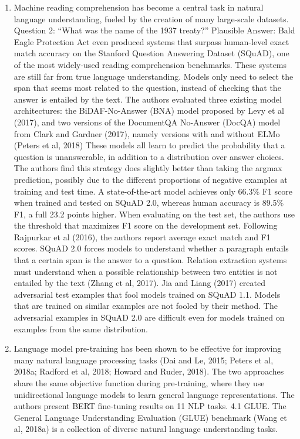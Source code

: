 \documentclass[11pt]{article}
\begin{document}
\begin{enumerate}
    \item Machine reading comprehension has become a central task in natural language understanding, fueled by the creation of many large-scale datasets. Question 2: “What was the name of the 1937 treaty?” Plausible Answer: Bald Eagle Protection Act even produced systems that surpass human-level exact match accuracy on the Stanford Question Answering Dataset (SQuAD), one of the most widely-used reading comprehension benchmarks. These systems are still far from true language understanding. Models only need to select the span that seems most related to the question, instead of checking that the answer is entailed by the text. The authors evaluated three existing model architectures: the BiDAF-No-Answer (BNA) model proposed by Levy et al (2017), and two versions of the DocumentQA No-Answer (DocQA) model from Clark and Gardner (2017), namely versions with and without ELMo (Peters et al, 2018)
    These models all learn to predict the probability that a question is unanswerable, in addition to a distribution over answer choices.
    The authors find this strategy does slightly better than taking the argmax prediction, possibly due to the different proportions of negative examples at training and test time. A state-of-the-art model achieves only 66.3\% F1 score when trained and tested on SQuAD 2.0, whereas human accuracy is 89.5\% F1, a full 23.2 points higher.
    When evaluating on the test set, the authors use the threshold that maximizes F1 score on the development set.
    Following Rajpurkar et al (2016), the authors report average exact match and F1 scores.  SQuAD 2.0 forces models to understand whether a paragraph entails that a certain span is the answer to a question.
    Relation extraction systems must understand when a possible relationship between two entities is not entailed by the text (Zhang et al, 2017).
    Jia and Liang (2017) created adversarial test examples that fool models trained on SQuAD 1.1. Models that are trained on similar examples are not fooled by their method.
    The adversarial examples in SQuAD 2.0 are difficult even for models trained on examples from the same distribution. \cite{dataset}
    \item Language model pre-training has been shown to be effective for improving many natural language processing tasks (Dai and Le, 2015; Peters et al, 2018a; Radford et al, 2018; Howard and Ruder, 2018).
    The two approaches share the same objective function during pre-training, where they use unidirectional language models to learn general language representations. The authors present BERT fine-tuning results on 11 NLP tasks. 4.1 GLUE. The General Language Understanding Evaluation (GLUE) benchmark (Wang et al, 2018a) is a collection of diverse natural language understanding tasks.

\end{enumerate}
\end{document}
